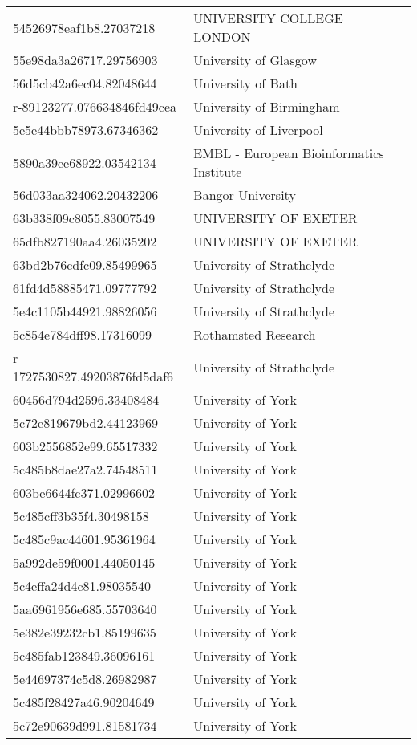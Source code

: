 \begin{tabular}{ll}
54526978eaf1b8.27037218 & UNIVERSITY COLLEGE LONDON \\
55e98da3a26717.29756903 & University of Glasgow \\
56d5cb42a6ec04.82048644 & University of Bath \\
r-89123277.076634846fd49cea & University of Birmingham \\
5e5e44bbb78973.67346362 & University of Liverpool \\
5890a39ee68922.03542134 & EMBL - European Bioinformatics Institute \\
56d033aa324062.20432206 & Bangor University \\
63b338f09c8055.83007549 & UNIVERSITY OF EXETER \\
65dfb827190aa4.26035202 & UNIVERSITY OF EXETER \\
63bd2b76cdfc09.85499965 & University of Strathclyde \\
61fd4d58885471.09777792 & University of Strathclyde \\
5e4c1105b44921.98826056 & University of Strathclyde \\
5c854e784dff98.17316099 & Rothamsted Research \\
r-1727530827.49203876fd5daf6 & University of Strathclyde \\
60456d794d2596.33408484 & University of York \\
5c72e819679bd2.44123969 & University of York \\
603b2556852e99.65517332 & University of York \\
5c485b8dae27a2.74548511 & University of York \\
603be6644fc371.02996602 & University of York \\
5c485cff3b35f4.30498158 & University of York \\
5c485c9ac44601.95361964 & University of York \\
5a992de59f0001.44050145 & University of York \\
5c4effa24d4c81.98035540 & University of York \\
5aa6961956e685.55703640 & University of York \\
5e382e39232cb1.85199635 & University of York \\
5c485fab123849.36096161 & University of York \\
5e44697374c5d8.26982987 & University of York \\
5c485f28427a46.90204649 & University of York \\
5c72e90639d991.81581734 & University of York \\

\end{tabular}
